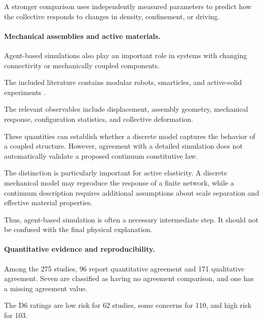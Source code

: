 A stronger comparison
uses independently
measured parameters
to predict how
the collective
responds to changes
in density,
confinement,
or driving.

\paragraph*{Mechanical assemblies and active materials.}

Agent-based simulations
also play an important
role in systems
with changing connectivity
or mechanically
coupled components.

The included literature
contains modular robots,
smarticles,
and active-solid
experiments
\cite{Vardhan2022glidersinshapecha,Savoie2019arobotmadeofrobo,Li2020programmingactiveg,Hu2026diatominspired1di,Rogowski2026coordinatedselfass,Kaeser2025individualandcolle,Bhattacharjee2026collectiveassembly,Li2019particleroboticsba,Baconnier2022tensioncontrolledc,Rezanejad2025programmableentangl,Brandenbourger2019nonreciprocalrobot,Brandenbourger2021limitcyclesturnac,Binysh2026moreislessinunpe,Coulais2025activemetamaterials,Chen2020selfsensingmetamat}.

The relevant observables
include displacement,
assembly geometry,
mechanical response,
configuration statistics,
and collective
deformation.

These quantities
can establish whether
a discrete model
captures the behavior
of a coupled structure.
However, agreement
with a detailed
simulation does not
automatically validate
a proposed continuum
constitutive law.

The distinction is
particularly important
for active elasticity.
A discrete mechanical
model may reproduce
the response of
a finite network,
while a continuum
description requires
additional assumptions
about scale separation
and effective
material properties.

Thus, agent-based
simulation is often
a necessary intermediate
step. It should not
be confused with
the final physical
explanation.

\paragraph*{Quantitative evidence and reproducibility.}

Among the 275 studies,
96 report quantitative
agreement and 171
qualitative agreement.
Seven are classified
as having no agreement
comparison, and one
has a missing
agreement value.

The D6 ratings are
low risk for 62 studies,
some concerns for 110,
and high risk for 103.

